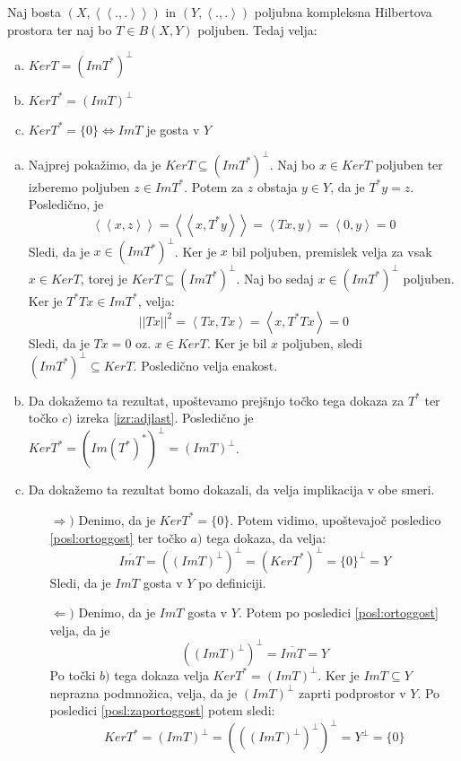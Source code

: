 \documentclass[mat2]{matdelo}
\newcommand{\abs}[1]{\ensuremath{\lvert #1 \rvert}}
\newcommand{\norm}[1]{\abs{\abs{#1}}}
\newcommand{\Sp}[2]{\ensuremath{\left<#1, #2\right>}}
\newcommand{\Spp}[2]{\ensuremath{\left<\left<#1, #2\right>\right>}}
\begin{document}
			\begin{lema}
				\label{lem:adjlast2}
				Naj bosta $(X, \Spp{.}{.})$ in $(Y, \Sp{.}{.})$ poljubna kompleksna Hilbertova prostora ter naj bo $T\in B(X, Y)$ poljuben. Tedaj velja: \begin{enumerate}[a)]
					\item $KerT = (ImT^*)^{\bot}$
					\item $KerT^* = (ImT)^{\bot}$
					\item $KerT^* = \{0\} \iff ImT$ je gosta v $Y$
				\end{enumerate}
			\end{lema}
			
			\begin{dokaz}
				\begin{enumerate}[a)]
					\item Najprej pokažimo, da je $KerT \subseteq (ImT^*)^\bot$. Naj bo $x\in KerT$ poljuben ter izberemo poljuben $z\in ImT^*$. Potem za $z$ obstaja $y\in Y$, da je $T^*y = z$. Posledično, je $$\Spp{x}{z} = \Spp{x}{T^*y} = \Sp{Tx}{y} = \Sp{0}{y} = 0$$
					Sledi, da je $x\in (ImT^*)^\bot$. Ker je $x$ bil poljuben, premislek velja za vsak $x\in KerT$, torej je $KerT \subseteq (ImT^*)^\bot$.
					Naj bo sedaj $x\in (ImT^*)^\bot$ poljuben. Ker je $T^*Tx \in ImT^*$, velja: $$\norm{Tx}^2 = \Sp{Tx}{Tx} = \Sp{x}{T^*Tx}= 0$$
					Sledi, da je $Tx = 0$ oz. $x\in KerT$. Ker je bil $x$ poljuben, sledi $(ImT^*)^\bot \subseteq KerT$. Posledično velja enakost.
					\item Da dokažemo ta rezultat, upoštevamo prejšnjo točko tega dokaza za $T^*$ ter točko $c)$ izreka \ref{izr:adjlast}. Posledično je $KerT^* = (Im(T^*)^*)^\bot = (ImT)^\bot$.
					\item Da dokažemo ta rezultat bomo dokazali, da velja implikacija v obe smeri. \begin{itemize}
						\item[$\Rightarrow)$] Denimo, da je $KerT^* = \{0\}$. Potem vidimo, upoštevajoč posledico \ref{posl:ortoggost} ter točko $a)$ tega dokaza, da velja: $$\overline{ImT} = ((ImT)^\bot)^\bot = (KerT^*)^\bot = \{0\}^\bot = Y$$
						Sledi, da je $ImT$ gosta v $Y$ po definiciji.
						\item[$\Leftarrow)$] Denimo, da je $ImT$ gosta v $Y$. Potem po posledici \ref{posl:ortoggost} velja, da je $$((ImT)^{\bot})^\bot = \overline{ImT} = Y$$ Po točki $b)$ tega dokaza velja $KerT^* = (ImT)^\bot$. Ker je $ImT\subseteq Y$ neprazna podmnožica, velja, da je $(ImT)^\bot$ zaprti podprostor v $Y$. Po posledici \ref{posl:zaportoggost} potem sledi: $$KerT^* = (ImT)^\bot =(((ImT)^\bot)^\bot)^\bot = Y^\bot = \{0\}$$
					\end{itemize} 
					
				\end{enumerate}
			\end{dokaz}
			
\end{document}
